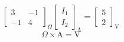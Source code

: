 \documentclass[border=12pt]{standalone}
\begin{document}
\color{weeknavy}
\[
\displaystyle
\begin{bmatrix}
3 & -1\\
-1 & 4
\end{bmatrix}_{\Omega}
\begin{bmatrix}
I_1\\
I_2
\end{bmatrix}_{\mathrm A}
=
\begin{bmatrix}
5\\
2
\end{bmatrix}_{\mathrm V}
\]
\vspace{8pt}
\[
\displaystyle \Omega\times\mathrm{A}=\mathrm{V}
\]
\end{document}
